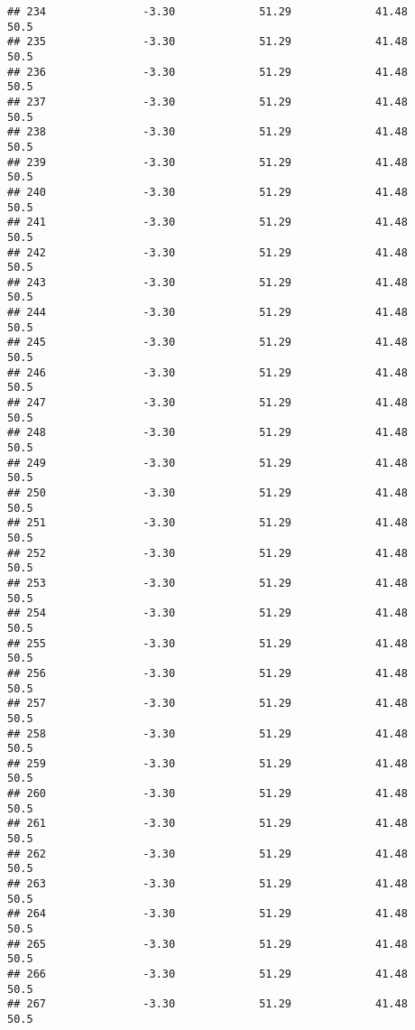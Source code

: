 \documentclass[]{article}
\begin{document}
\begin{verbatim}
## 234               -3.30             51.29             41.48           50.5
## 235               -3.30             51.29             41.48           50.5
## 236               -3.30             51.29             41.48           50.5
## 237               -3.30             51.29             41.48           50.5
## 238               -3.30             51.29             41.48           50.5
## 239               -3.30             51.29             41.48           50.5
## 240               -3.30             51.29             41.48           50.5
## 241               -3.30             51.29             41.48           50.5
## 242               -3.30             51.29             41.48           50.5
## 243               -3.30             51.29             41.48           50.5
## 244               -3.30             51.29             41.48           50.5
## 245               -3.30             51.29             41.48           50.5
## 246               -3.30             51.29             41.48           50.5
## 247               -3.30             51.29             41.48           50.5
## 248               -3.30             51.29             41.48           50.5
## 249               -3.30             51.29             41.48           50.5
## 250               -3.30             51.29             41.48           50.5
## 251               -3.30             51.29             41.48           50.5
## 252               -3.30             51.29             41.48           50.5
## 253               -3.30             51.29             41.48           50.5
## 254               -3.30             51.29             41.48           50.5
## 255               -3.30             51.29             41.48           50.5
## 256               -3.30             51.29             41.48           50.5
## 257               -3.30             51.29             41.48           50.5
## 258               -3.30             51.29             41.48           50.5
## 259               -3.30             51.29             41.48           50.5
## 260               -3.30             51.29             41.48           50.5
## 261               -3.30             51.29             41.48           50.5
## 262               -3.30             51.29             41.48           50.5
## 263               -3.30             51.29             41.48           50.5
## 264               -3.30             51.29             41.48           50.5
## 265               -3.30             51.29             41.48           50.5
## 266               -3.30             51.29             41.48           50.5
## 267               -3.30             51.29             41.48           50.5

\end{verbatim}
\end{document}
